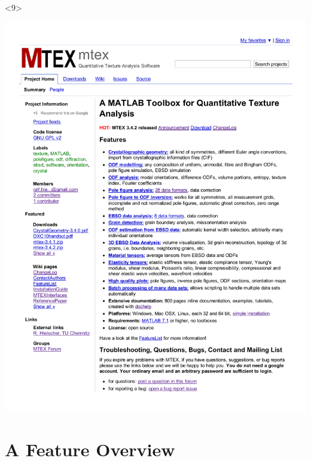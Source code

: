 \documentclass[comptress]{beamer}
\begin{document}
\begin{frame}[fragile]
\begin{overlayarea}{\textwidth}{5cm}
\begin{onlyenv}<9>
  \centerline{
  \includegraphics[width=\textwidth]{pic/mtex}
  }
\end{onlyenv}

\end{overlayarea}

\end{frame}


\section{A Feature Overview}
\end{document}
